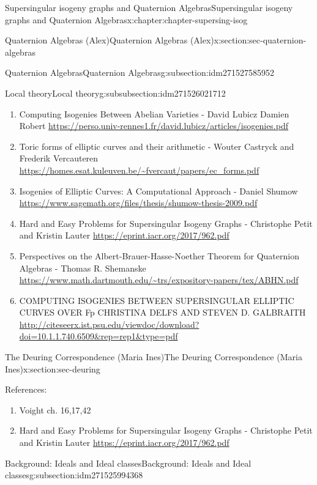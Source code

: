 \documentclass[oneside,10pt,]{book}
\numberwithin{equation}{section}
\begin{document}
\begin{chapterptx}{Supersingular isogeny graphs and Quaternion Algebras}{}{Supersingular isogeny graphs and Quaternion Algebras}{}{}{x:chapter:chapter-supersing-isog}
\begin{sectionptx}{Quaternion Algebras (Alex)}{}{Quaternion Algebras (Alex)}{}{}{x:section:sec-quaternion-algebras}
\begin{subsectionptx}{Quaternion Algebras}{}{Quaternion Algebras}{}{}{g:subsection:idm271527585952}
\begin{subsubsectionptx}{Local theory}{}{Local theory}{}{}{g:subsubsection:idm271526021712}
\begin{enumerate}
\item{}Computing Isogenies Between Abelian Varieties - David Lubicz Damien Robert \url{https://perso.univ-rennes1.fr/david.lubicz/articles/isogenies.pdf}%
\item{}Toric forms of elliptic curves and their arithmetic - Wouter Castryck and Frederik Vercauteren \url{https://homes.esat.kuleuven.be/\~fvercaut/papers/ec_forms.pdf}%
\item{}Isogenies of Elliptic Curves: A Computational Approach - Daniel Shumow \url{https://www.sagemath.org/files/thesis/shumow-thesis-2009.pdf}%
\item{}Hard and Easy Problems for Supersingular Isogeny Graphs - Christophe Petit and Kristin Lauter \url{https://eprint.iacr.org/2017/962.pdf}%
\item{}Perspectives on the Albert-Brauer-Hasse-Noether Theorem for Quaternion Algebras -  Thomas R. Shemanske \url{https://www.math.dartmouth.edu/\~trs/expository-papers/tex/ABHN.pdf}%
\item{}COMPUTING ISOGENIES BETWEEN SUPERSINGULAR ELLIPTIC CURVES OVER Fp CHRISTINA DELFS AND STEVEN D. GALBRAITH \url{http://citeseerx.ist.psu.edu/viewdoc/download?doi=10.1.1.740.6509\&rep=rep1\&type=pdf}%
\end{enumerate}
%
\end{subsubsectionptx}
\end{subsectionptx}
\end{sectionptx}
%
%
\typeout{************************************************}
\typeout{************************************************}
%
\begin{sectionptx}{The Deuring Correspondence (Maria Ines)}{}{The Deuring Correspondence (Maria Ines)}{}{}{x:section:sec-deuring}
\begin{introduction}{}%
References:%
\par
%
\begin{enumerate}
\item{}Voight ch. 16,17,42%
\item{}Hard and Easy Problems for Supersingular Isogeny Graphs - Christophe Petit and Kristin Lauter \url{https://eprint.iacr.org/2017/962.pdf}%
\end{enumerate}
%
\end{introduction}%
%
%
\typeout{************************************************}
\typeout{************************************************}
%
\begin{subsectionptx}{Background: Ideals and Ideal classes}{}{Background: Ideals and Ideal classes}{}{}{g:subsection:idm271525994368}

\end{subsectionptx}
\end{sectionptx}
\end{chapterptx}
\end{document}
